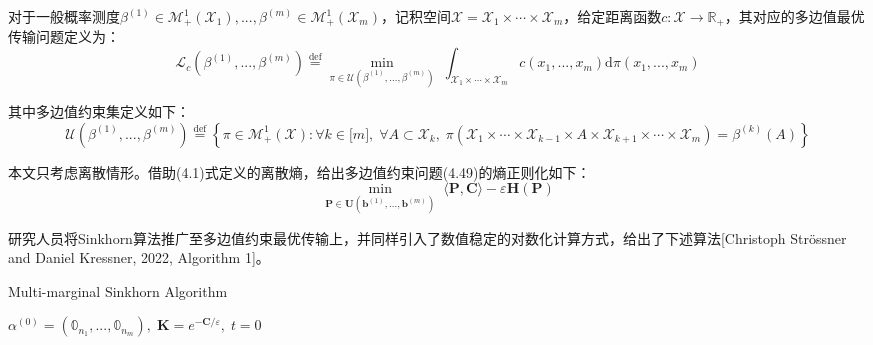 \documentclass[cn,10pt,math=newtx,citestyle=gb7714-2015,bibstyle=gb7714-2015]{elegantbook}
\begin{document}
\begin{postulate}[一般测度的多边值约束最优传输]
对于一般概率测度$\beta^{(1)}\in\mathcal{M}_+^1(\mathcal{X}_1),...,\beta^{(m)}\in\mathcal{M}_+^1(\mathcal{X}_m)$，记积空间$\mathcal{X}=\mathcal{X}_1\times \cdots \times \mathcal{X}_{m}$，给定距离函数$c:\mathcal{X} \to \mathbb{R}_+$，其对应的多边值最优传输问题定义为：
    \begin{equation}
        \mathcal{L}_c(\beta^{(1)},...,\beta^{(m)}) \overset{\text{def}}{=}  \min_{\pi\in\mathcal{U}(\beta^{(1)},...,\beta^{(m)})} \; \int_{\mathcal{X}_1\times \cdots \times \mathcal{X}_m} c(x_1,...,x_m) \text{d} \pi(x_1,...,x_m)
    \end{equation}

其中多边值约束集定义如下：
\begin{equation*}
    \mathcal{U}(\beta^{(1)},...,\beta^{(m)}) \overset{\text{def}}{=}\left\{ \pi\in\mathcal{M}_+^1(\mathcal{X}) : \forall k\in \mathbb{[}m\mathbb{]},\; \forall A\subset\mathcal{X}_k,\; \pi(\mathcal{X}_1\times \cdots \times \mathcal{X}_{k-1} \times A \times \mathcal{X}_{k+1}\times \cdots \times \mathcal{X}_{m}) = \beta^{(k)}(A) \right\}
\end{equation*}
    
\end{postulate}

本文只考虑离散情形。借助(4.1)式定义的离散熵，给出多边值约束问题(4.49)的熵正则化如下：
\begin{equation}
    \min_{\mathbf{P}\in\mathbf{U}(\mathbf{b}^{(1)},...,\mathbf{b}^{(m)})} \; \langle \mathbf{P}, \mathbf{C} \rangle - \varepsilon \mathbf{H(P)}
\end{equation}

研究人员将Sinkhorn算法推广至多边值约束最优传输上，并同样引入了数值稳定的对数化计算方式，给出了下述算法[Christoph Str\"ossner and Daniel Kressner, 2022, Algorithm 1]。

\begin{algorithm}
    \caption{Multi-marginal Sinkhorn Algorithm}%
	
	\Set $\alpha^{(0)}=(\mathbb{0}_{n_1},...,\mathbb{0}_{n_m}),\; \mathbf{K}=e^{-\mathbf{C}/\varepsilon},\; t=0$
	
\end{algorithm}
\end{document}
